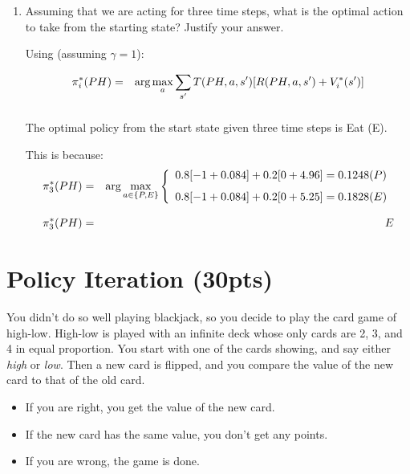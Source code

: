 \documentclass[12pt]{article}
\begin{document}
\begin{enumerate}
\item Assuming that we are acting for three time steps, what is the
  optimal action to take from the starting state? Justify your answer.

Using (assuming $\gamma = 1$):

\begin{eqnarray*}
\pi^*_i(PH) &=& \hbox{arg} \max_a \sum_{s'} T(PH,a,s') [R(PH,a,s') + V^*_i(s')] \\[.1in]
\end{eqnarray*}

The optimal policy from the start state given three time steps is Eat (E).

This is because:
\begin{eqnarray*}
  \pi^*_3(PH) &=& \hbox{arg} \max_{a \in \{P, E\}} \left\{
               \begin{array}{l}
                0.8[-1+0.084] + 0.2[0 + 4.96] = 0.1248 (P)
                \\[.1in]
                0.8[-1+0.084] + 0.2[0 + 5.25] = 0.1828 (E)
               \end{array} \right. \\[.1in]
  \pi^*_3(PH) &=& E 
\end{eqnarray*}



\end{enumerate}

\clearpage

\section{Policy Iteration (30pts)}

You didn't do so well playing blackjack, so you decide to play the
card game of high-low.  High-low is played with an infinite deck whose
only cards are 2, 3, and 4 in equal proportion.  You start with one of
the cards showing, and say either {\it high} or {\it low}.  Then a new
card is flipped, and you compare the value of the new card to that of
the old card.

\begin{itemize}

\item If you are right, you get the value of the new card.

\item If the new card has the same value, you don't get any points.

\item If you are wrong, the game is done.

\end{itemize}
\end{document}
